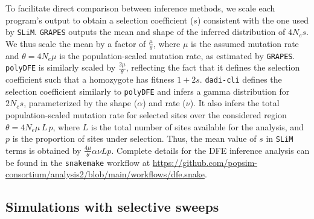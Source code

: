 \documentclass[hidelinks]{article}
\newcommand{\slim}{\texttt{SLiM}\xspace}
\newcommand{\snakemake}{\texttt{snakemake}\xspace}
\newcommand{\polydfe}{\texttt{polyDFE}\xspace}
\newcommand{\dadicli}{\texttt{dadi-cli}\xspace}
\newcommand{\grapes}{\texttt{GRAPES}\xspace}
\begin{document}
    To facilitate direct comparison between inference methods,
    we scale each program's output to obtain a selection coefficient ($s$) consistent with the one used by \slim.
    \grapes outputs the mean and shape of the inferred distribution of $4N_es$.
    We thus scale the mean by a factor of  $\frac{\mu}{\theta}$,
    where $\mu$ is the assumed mutation rate and
    $\theta=4N_{e}\mu$ is the population-scaled mutation rate, as estimated by \grapes.
    \polydfe is similarly scaled by $\frac{2\mu}{\theta}$,
    reflecting the fact that it defines the selection coefficient such that a homozygote has fitness $1+ 2s$.
    \dadicli defines the selection coefficient similarly to \polydfe and infers a gamma distribution for $2 N_e s$, parameterized by the shape ($\alpha$) and rate ($\nu$).
    It also infers the total population-scaled mutation rate for selected sites over the considered region $\theta = 4 N_e \mu\, L\, p$,
    where $L$ is the total number of sites available for the analysis,
    and $p$ is the proportion of sites under selection.
    Thus, the mean value of $s$ in \slim terms is obtained by  $\frac{4\mu}{\theta} \alpha \nu L p$.
    Complete details for the DFE inference analysis can be found in the
    \snakemake workflow at \url{https://github.com/popsim-consortium/analysis2/blob/main/workflows/dfe.snake}.



    \subsection*{Simulations with selective sweeps}
\end{document}
